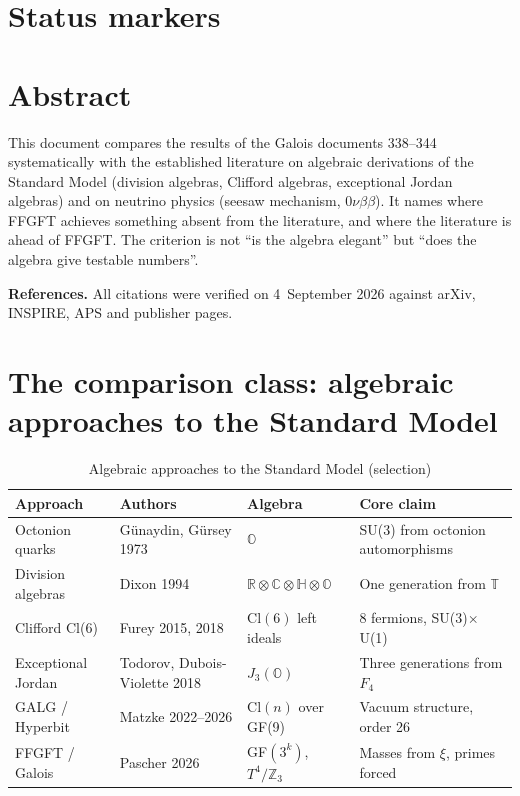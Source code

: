 
\providecommand{\BM}{\textbf{[B]}}
\providecommand{\KM}{\textbf{[K]}}
\providecommand{\SM}{\textbf{[S]}}
\providecommand{\XM}{\textbf{[X]}}

{}



\section*{Status markers}



\section*{Abstract}

This document compares the results of the Galois documents 338--344 systematically
with the established literature on algebraic derivations of the Standard Model
(division algebras, Clifford algebras, exceptional Jordan algebras) and on neutrino
physics (seesaw mechanism, $0\nu\beta\beta$). It names where FFGFT achieves something
absent from the literature, and where the literature is ahead of FFGFT. The criterion
is not ``is the algebra elegant'' but ``does the algebra give testable numbers''.

\textbf{References.} All citations were verified on 4~September 2026 against arXiv,
INSPIRE, APS and publisher pages.

\section{The comparison class: algebraic approaches to the Standard Model}

\begin{table}[H]
\centering
\caption{Algebraic approaches to the Standard Model (selection)}
\begin{tabular}{llll}
\toprule
Approach & Authors & Algebra & Core claim \\
\midrule
Octonion quarks & Günaydin, Gürsey 1973 & $\mathbb{O}$ & SU(3) from octonion automorphisms \\
Division algebras & Dixon 1994 & $\mathbb{R}\otimes\mathbb{C}\otimes\mathbb{H}\otimes\mathbb{O}$ & One generation from $\mathbb{T}$ \\
Clifford Cl(6) & Furey 2015, 2018 & Cl$(6)$ left ideals & 8 fermions, SU(3)$\times$U(1) \\
Exceptional Jordan & Todorov, Dubois-Violette 2018 & $J_3(\mathbb{O})$ & Three generations from $F_4$ \\
GALG / Hyperbit & Matzke 2022--2026 & Cl$(n)$ over GF(9) & Vacuum structure, order 26 \\
FFGFT / Galois & Pascher 2026 & GF$(3^k)$, $T^4/\mathbb{Z}_3$ & Masses from $\xi$, primes forced \\
\bottomrule
\end{tabular}
\end{table}

